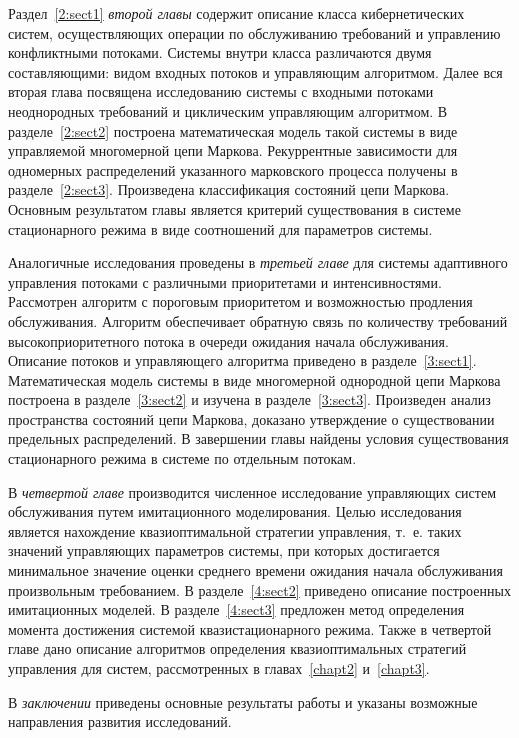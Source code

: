 Раздел~\ref{2:sect1} \textit{второй главы} содержит описание класса кибернетических систем, осуществляющих операции по обслуживанию требований и управлению конфликтными потоками. Системы внутри класса различаются двумя составляющими: видом входных потоков и управляющим алгоритмом. Далее вся вторая глава посвящена исследованию системы с входными потоками неоднородных требований и циклическим управляющим алгоритмом. В разделе~\ref{2:sect2} построена математическая модель такой системы в виде управляемой многомерной цепи Маркова. Рекуррентные зависимости для одномерных распределений указанного марковского процесса получены в разделе~\ref{2:sect3}. Произведена классификация состояний цепи Маркова. Основным результатом главы является критерий существования в системе стационарного режима в виде соотношений для параметров системы.

Аналогичные исследования проведены в \textit{третьей главе} для системы адаптивного управления потоками с различными приоритетами и интенсивностями. Рассмотрен алгоритм с пороговым приоритетом и возможностью продления обслуживания. Алгоритм обеспечивает обратную связь по количеству требований высокоприоритетного потока в очереди ожидания начала обслуживания. Описание потоков и управляющего алгоритма приведено в разделе~\ref{3:sect1}. Математическая модель системы в виде многомерной однородной цепи Маркова построена в разделе~\ref{3:sect2} и изучена в разделе~\ref{3:sect3}. Произведен анализ пространства состояний цепи Маркова, доказано утверждение о существовании предельных распределений. В завершении главы найдены условия существования стационарного режима в системе по отдельным потокам.

В \textit{четвертой главе} производится численное исследование управляющих систем обслуживания путем имитационного моделирования. Целью исследования является нахождение квазиоптимальной стратегии управления, т.~е. таких значений управляющих параметров системы, при которых достигается минимальное значение оценки среднего времени ожидания начала обслуживания произвольным требованием. В разделе~\ref{4:sect2} приведено описание построенных имитационных моделей. В разделе~\ref{4:sect3} предложен метод определения момента достижения системой квазистационарного режима. Также в четвертой главе дано описание алгоритмов определения квазиоптимальных стратегий управления для  систем, рассмотренных в главах~\ref{chapt2} и~\ref{chapt3}.

В \textit{заключении} приведены основные результаты работы и указаны возможные направления развития исследований.
